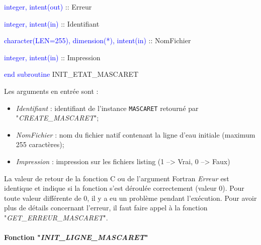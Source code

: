 \documentclass[a4paper,11pt]{article}
\begin{document}
        \hspace{1cm} \textcolor{blue}{integer, intent(out)} :: Erreur
        
        \hspace{1cm} \textcolor{blue}{integer, intent(in)}  :: Identifiant
        
        \hspace{1cm} \textcolor{blue}{character(LEN=255), dimension(*), intent(in)} :: NomFichier
        
        \hspace{1cm} \textcolor{blue}{integer, intent(in)}  :: Impression
        
    \textcolor{blue}{end subroutine} INIT\_ETAT\_MASCARET

 \vspace{0.5cm}

 Les arguments en entr\'ee sont :
 
 \vspace{0.5cm}
 
 \begin{itemize}
   \item \textit{Identifiant} : identifiant de l'instance \texttt{MASCARET} retourn\'e par "\textit{CREATE\_MASCARET}";
    \vspace{0.5cm}
   \item \textit{NomFichier} : nom du fichier natif contenant la ligne d'eau initiale (maximum 255 caract\`eres);
    \vspace{0.5cm}
   \item  \textit{Impression} : impression sur les fichiers listing (1 --> Vrai, 0 --> Faux)
 \end{itemize}

 \vspace{0.5cm}
 
  La valeur de retour de la fonction C ou de l'argument Fortran \textit{Erreur} est identique et indique si la fonction s'est d\'eroul\'ee correctement (valeur 0). Pour toute valeur diff\'erente de 0, il y a eu un probl\`eme pendant l'ex\'ecution. Pour avoir plus de d\'etails concernant l'erreur, il faut faire appel \`a la fonction "\textit{GET\_ERREUR\_MASCARET}".
  
 \paragraph{Fonction "\textit{INIT\_LIGNE\_MASCARET}"\\}

 \hspace*{1cm}
 
\end{document}
